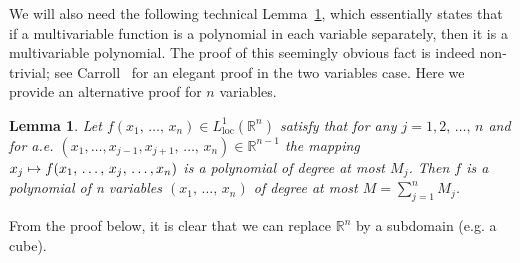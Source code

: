 \documentclass[10pt]{amsart}
\newtheorem{lemm}[theo]{Lemma}\newtheorem{prop}[theo]{Proposition}\newtheorem{coro}[theo]{Corollary}\newtheorem{conj}[theo]{Conjecture}
\theoremstyle{definition}\newtheorem{defi}[theo]{Definition}\newtheorem{rema}[theo]{Remark}\newtheorem{exam}[theo]{Example}\newtheorem{exem}[theo]{Example}\newtheorem{nota}[theo]{Notation}
\newcommand*\R {\mathbb{R}}
\newcommand\1{{\ensuremath {\mathds 1} }}
\DeclareMathOperator{\loc}{loc}
\begin{document}
We will also need the following technical Lemma~\ref{lem:multivariate-polynomial}, which essentially states that if a multivariable function is a polynomial in each variable separately, then it is a multivariable polynomial. The proof of this seemingly obvious fact is indeed non-trivial; see Carroll~\cite{Carroll-61} for an elegant proof in the two variables case. Here we provide an alternative proof for $n$ variables.

\begin{lemm}\label{lem:multivariate-polynomial}
Let $f(x_1,\,\ldots,\,x_n) \in L^1_{\loc}(\R^n)$ satisfy that for any $j=1,2,\,\ldots,\,n$ and for a.e. $(x_1,\ldots,x_{j-1},x_{j+1},\,\ldots,\,x_n) \in \R^{n-1}$ the mapping $x_j\mapsto f(x_1,\,\ldots,\,x_j,\,\ldots,\linebreak x_n)$ is a polynomial of degree at most $M_j$. Then $f$ is a polynomial of n variables $(x_1,\,\ldots,\,x_n)$ of degree at most $M=\sum_{j=1}^n M_j$.
\end{lemm}

From the proof below, it is clear that we can replace $\R^n$ by a subdomain (e.g. a cube).
\end{document}
